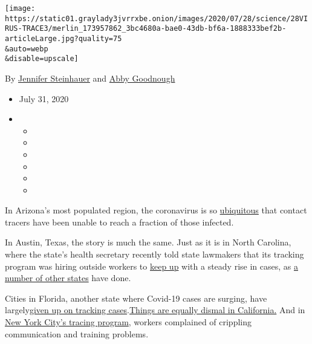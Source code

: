\texttt{[image: https://static01.graylady3jvrrxbe.onion/images/2020/07/28/science/28VIRUS-TRACE3/merlin\_173957862\_3bc4680a-bae0-43db-bf6a-1888333bef2b-articleLarge.jpg?quality=75\\\&auto=webp\\\&disable=upscale]}

By
\href{https://www.nytimes3xbfgragh.onion/by/jennifer-steinhauer}{Jennifer
Steinhauer} and
\href{https://www.nytimes3xbfgragh.onion/by/abby-goodnough}{Abby
Goodnough}

\begin{itemize}
\item
  July 31, 2020
\item
  \begin{itemize}
  \item
  \item
  \item
  \item
  \item
  \item
  \end{itemize}
\end{itemize}

In Arizona's most populated region, the coronavirus is so
\href{https://www.azfamily.com/news/continuing_coverage/coronavirus_coverage/contact-tracing-important-but-less-useful-with-spiking-cases-maricopa-county-says/article_57d55328-bb4b-11ea-8718-8b1cf4ab4137.html}{ubiquitous}
that contact tracers have been unable to reach a fraction of those
infected.

In Austin, Texas, the story is much the same. Just as it is in North
Carolina, where the state's health secretary recently told state
lawmakers that its tracking program was hiring outside workers to
\href{https://www.ncdhhs.gov/news/press-releases/ncdhhs-selects-first-vendors-expand-testing-and-contact-tracing-covid-19}{keep
up} with a steady rise in cases, as
\href{https://www.nashp.org/state-approaches-to-contact-tracing-covid-19/}{a
number of other states} have done.

Cities in Florida, another state where Covid-19 cases are surging, have
largely\href{https://www.nbcmiami.com/news/local/miami-beach-mayor-urges-desantis-to-address-failures-of-floridas-contact-tracing-program/2268324/}{given
up on tracking
cases}.\href{https://www.washingtonpost.com/national/coronavirus-ravaged-florida-as-ron-desantis-sidelined-scientists-and-followed-trump/2020/07/25/0b8008da-c648-11ea-b037-f9711f89ee46_story.htmlhttps://calmatters.org/health/coronavirus/2020/07/california-covid-contact-tracers-video-los-angeles/}{Things
are equally dismal in California.} And in
\href{https://www.nytimes3xbfgragh.onion/2020/07/29/nyregion/new-york-contact-tracing.html}{New
York City's tracing program}, workers complained of crippling
communication and training problems.

